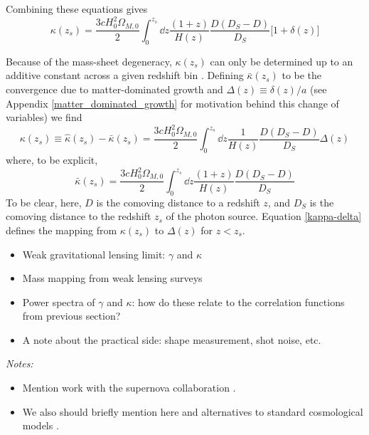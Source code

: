 Combining these equations gives
\begin{equation}
  \kappa(z_s) = \frac{3cH_0^2\Omega_{M,0}}{2}\int_0^{z_s} \dd z \frac{(1+z)}{H(z)} \frac{D(D_S-D)}{D_S}\big[1+\delta(z)\big]
\end{equation}

Because of the mass-sheet degeneracy, $\kappa(z_s)$ can only be determined up to an additive constant across a given redshift bin \citep[see][for discussion]{Seitz_Schneider96}.  Defining $\bar{\kappa}(z_s)$ to be the convergence due to matter-dominated growth and $\Delta(z) \equiv \delta(z)/a$ (see Appendix \ref{matter_dominated_growth} for motivation behind this change of variables) we find
\begin{equation}
  \label{kappa-delta}
  \kappa(z_s) \equiv \hat{\kappa}(z_s)-\bar\kappa(z_s) = 
  \frac{3cH_0^2\Omega_{M,0}}{2}\int_0^{z_s} \dd z 
  \frac{1}{H(z)} \frac{D(D_S-D)}{D_S}\Delta(z)
\end{equation}
where, to be explicit,
\begin{equation}
  \bar\kappa(z_s) = \frac{3cH_0^2\Omega_{M,0}}{2}\int_0^{z_s} \dd z 
  \frac{(1+z)}{H(z)} \frac{D(D_S-D)}{D_S}
\end{equation}
To be clear, here, $D$ is the comoving distance to a redshift $z$, and $D_S$ is the comoving distance to the redshift $z_s$ of the photon source.  Equation \ref{kappa-delta} defines the mapping from $\kappa(z_s)$ to $\Delta(z)$ for $z<z_s$. 

\begin{itemize}
  \item Weak gravitational lensing limit: $\gamma$ and $\kappa$
  \item Mass mapping from weak lensing surveys
  \item Power spectra of $\gamma$ and $\kappa$: how do these relate to
    the correlation functions from previous section?
  \item A note about the practical side: shape measurement, shot noise,
    etc.
\end{itemize}

{\it Notes:}
\begin{itemize}
  \item Mention work with the supernova collaboration \citep{Kessler2009}.
  \item We also should briefly mention here \cite{Jain2011} and alternatives
    to standard cosmological models \citep[also][]{Sollerman2009}.
\end{itemize}
